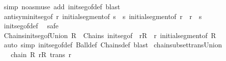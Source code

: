 \begin{isabellebody}
%
\isatagproof
{}\isamarkupfalse%
\ {\isacharparenleft}{\kern0pt}simp\ {\isacharparenleft}{\kern0pt}no{\isacharunderscore}{\kern0pt}asm{\isacharunderscore}{\kern0pt}use{\isacharparenright}{\kern0pt}\ add{\isacharcolon}{\kern0pt}\ init{\isacharunderscore}{\kern0pt}seg{\isacharunderscore}{\kern0pt}of{\isacharunderscore}{\kern0pt}def{\isacharparenright}{\kern0pt}\ blast%
\endisatagproof
{\isafoldproof}%
%
\isadelimproof
\isanewline
%
\endisadelimproof
\isanewline
{}\isamarkupfalse%
\ antisym{\isacharunderscore}{\kern0pt}init{\isacharunderscore}{\kern0pt}seg{\isacharunderscore}{\kern0pt}of{\isacharcolon}{\kern0pt}\ {\isachardoublequoteopen}r\ initial{\isacharunderscore}{\kern0pt}segment{\isacharunderscore}{\kern0pt}of\ s\ {\isasymLongrightarrow}\ s\ initial{\isacharunderscore}{\kern0pt}segment{\isacharunderscore}{\kern0pt}of\ r\ {\isasymLongrightarrow}\ r\ {\isacharequal}{\kern0pt}\ s{\isachardoublequoteclose}\isanewline
%
\isadelimproof
\ \ %
\endisadelimproof
%
\isatagproof
{}\isamarkupfalse%
\ init{\isacharunderscore}{\kern0pt}seg{\isacharunderscore}{\kern0pt}of{\isacharunderscore}{\kern0pt}def\ \isamarkupfalse%
\ safe%
\endisatagproof
{\isafoldproof}%
%
\isadelimproof
\isanewline
%
\endisadelimproof
\isanewline
{}\isamarkupfalse%
\ Chains{\isacharunderscore}{\kern0pt}init{\isacharunderscore}{\kern0pt}seg{\isacharunderscore}{\kern0pt}of{\isacharunderscore}{\kern0pt}Union{\isacharcolon}{\kern0pt}\ {\isachardoublequoteopen}R\ {\isasymin}\ Chains\ init{\isacharunderscore}{\kern0pt}seg{\isacharunderscore}{\kern0pt}of\ {\isasymLongrightarrow}\ r{\isasymin}R\ {\isasymLongrightarrow}\ r\ initial{\isacharunderscore}{\kern0pt}segment{\isacharunderscore}{\kern0pt}of\ {\isasymUnion}R{\isachardoublequoteclose}\isanewline
%
\isadelimproof
\ \ %
\endisadelimproof
%
\isatagproof
{}\isamarkupfalse%
\ {\isacharparenleft}{\kern0pt}auto\ simp{\isacharcolon}{\kern0pt}\ init{\isacharunderscore}{\kern0pt}seg{\isacharunderscore}{\kern0pt}of{\isacharunderscore}{\kern0pt}def\ Ball{\isacharunderscore}{\kern0pt}def\ Chains{\isacharunderscore}{\kern0pt}def{\isacharparenright}{\kern0pt}\ blast%
\endisatagproof
{\isafoldproof}%
%
\isadelimproof
\isanewline
%
\endisadelimproof
\isanewline
{}\isamarkupfalse%
\ chain{\isacharunderscore}{\kern0pt}subset{\isacharunderscore}{\kern0pt}trans{\isacharunderscore}{\kern0pt}Union{\isacharcolon}{\kern0pt}\isanewline
\ \ \ {\isachardoublequoteopen}chain\isactrlsub {\isasymsubseteq}\ R{\isachardoublequoteclose}\ {\isachardoublequoteopen}{\isasymforall}r{\isasymin}R{\isachardot}{\kern0pt}\ trans\ r{\isachardoublequoteclose}\isanewline

\end{isabellebody}
